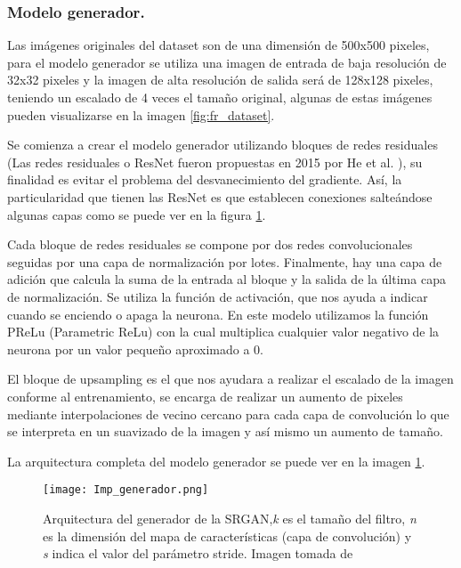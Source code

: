 \subsubsection{Modelo generador.}

Las imágenes originales del dataset son de una dimensión de 500x500 pixeles, para el modelo generador
se utiliza una imagen de entrada de baja resolución de 32x32 pixeles y la imagen de alta resolución de salida
será de 128x128 pixeles, teniendo un escalado de 4 veces el tamaño original, algunas de estas imágenes pueden
visualizarse en la imagen \ref{fig:fr_dataset}.


Se comienza a crear el modelo generador utilizando bloques de
redes residuales (Las redes residuales o ResNet fueron
propuestas en 2015 por He et al. \cite{Resnet}), su finalidad es evitar el problema del desvanecimiento del gradiente. Así, la particularidad
que tienen las ResNet es que establecen conexiones salteándose algunas
capas como se puede ver en la figura \ref{Alexis4}.

Cada bloque de redes residuales se compone por dos redes convolucionales
seguidas por una capa de normalización por lotes. Finalmente, hay una
capa de adición que calcula la suma de la entrada al bloque y la salida
de la última capa de normalización. Se utiliza la función de activación, que nos ayuda a indicar cuando
se enciendo o apaga la neurona. En este modelo utilizamos la función 
PReLu (Parametric ReLu) con la cual multiplica cualquier valor negativo de la neurona
por un valor pequeño aproximado a 0.


El bloque de upsampling es el que nos ayudara a realizar el escalado de la imagen conforme al entrenamiento,
se encarga de realizar un aumento de pixeles mediante interpolaciones de vecino cercano para cada 
capa de convolución lo que se interpreta en un suavizado de la imagen y así mismo un aumento de tamaño.

La arquitectura completa del modelo generador se puede ver en la imagen \ref{Alexis4}.


\begin{figure}[H]
  \begin{center}
    \texttt{[image: Imp\_generador.png]}
    \caption{Arquitectura del generador de la SRGAN,\emph{k} es el tamaño del
    filtro, \emph{n} es la dimensión del mapa de características (capa de convolución) y \emph{s} indica
    el valor del parámetro stride. Imagen tomada de \cite{SRGAN}}
    \label{Alexis4}
  \end{center}
\end{figure}

